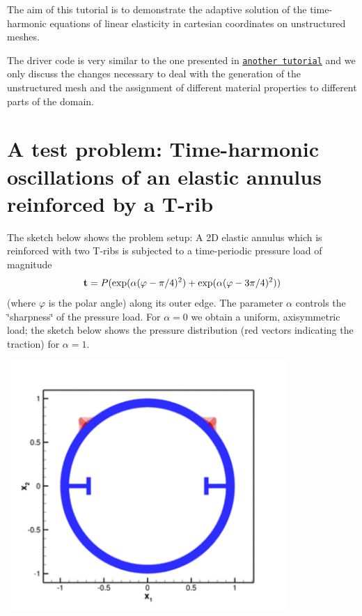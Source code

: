The aim of this tutorial is to demonstrate the adaptive solution of the time-\/harmonic equations of linear elasticity in cartesian coordinates on unstructured meshes.

The driver code is very similar to the one presented in \href{../../elastic_annulus/html/index.html}{\tt another tutorial} and we only discuss the changes necessary to deal with the generation of the unstructured mesh and the assignment of different material properties to different parts of the domain.



 

\hypertarget{index_test}{}\section{A test problem\+: Time-\/harmonic oscillations of an elastic annulus reinforced by a T-\/rib}\label{index_test}
The sketch below shows the problem setup\+: A 2D elastic annulus which is reinforced with two T-\/ribs is subjected to a time-\/periodic pressure load of magnitude \[ {\bf t} = P ( \exp(\alpha(\varphi-\pi/4)^2) + \exp(\alpha(\varphi-3\pi/4)^2) ) \] (where $ \varphi $ is the polar angle) along its outer edge. The parameter $ \alpha $ controls the \char`\"{}sharpness\char`\"{} of the pressure load. For $ \alpha=0 $ we obtain a uniform, axisymmetric load; the sketch below shows the pressure distribution (red vectors indicating the traction) for $ \alpha = 1. $

 
\begin{DoxyImage}
\includegraphics[width=0.8\textwidth]{setup}
\end{DoxyImage}


